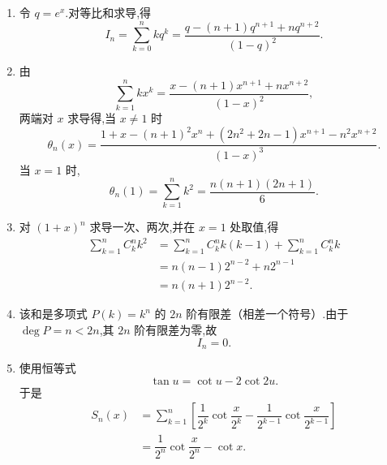 \begin{solution}
    \begin{enumerate}
        \item 令 $q=e^x$.对等比和求导,得
              \[
                  I_n=\sum\limits_{k=0}^{n}kq^k
                  =\dfrac{q-(n+1)q^{n+1}+nq^{n+2}}{(1-q)^2}.
              \]
        \item 由
              \[
                  \sum\limits_{k=1}^{n}kx^k
                  =\dfrac{x-(n+1)x^{n+1}+nx^{n+2}}{(1-x)^2},
              \]
              两端对 $x$ 求导得,当 $x\neq1$ 时
              \[
                  \theta_n(x)=
                  \dfrac{1+x-(n+1)^2x^n+(2n^2+2n-1)x^{n+1}-n^2x^{n+2}}
                  {(1-x)^3}.
              \]
              当 $x=1$ 时,
              \[
                  \theta_n(1)=\sum\limits_{k=1}^{n}k^2
                  =\dfrac{n(n+1)(2n+1)}{6}.
              \]
        \item 对 $(1+x)^n$ 求导一次、两次,并在 $x=1$ 处取值,得
              \[
                  \begin{aligned}
                      \sum\limits_{k=1}^{n}C_k^n k^2
                       & =\sum\limits_{k=1}^{n}C_k^n k(k-1)
                      +\sum\limits_{k=1}^{n}C_k^n k         \\
                       & =n(n-1)2^{n-2}+n2^{n-1}            \\
                       & =n(n+1)2^{n-2}.
                  \end{aligned}
              \]
        \item 该和是多项式 $P(k)=k^n$ 的 $2n$ 阶有限差（相差一个符号）.由于 $\deg P=n<2n$,其 $2n$ 阶有限差为零,故
              \[
                  I_n=0.
              \]
        \item 使用恒等式
              \[
                  \tan u=\cot u-2\cot2u.
              \]
              于是
              \[
                  \begin{aligned}
                      S_n(x)
                       & =\sum\limits_{k=1}^{n}\left[
                          \dfrac{1}{2^k}\cot\dfrac{x}{2^k}
                          -\dfrac{1}{2^{k-1}}\cot\dfrac{x}{2^{k-1}}
                      \right]                                      \\
                       & =\dfrac{1}{2^n}\cot\dfrac{x}{2^n}-\cot x.
                  \end{aligned}
              \]
    \end{enumerate}
\end{solution}

